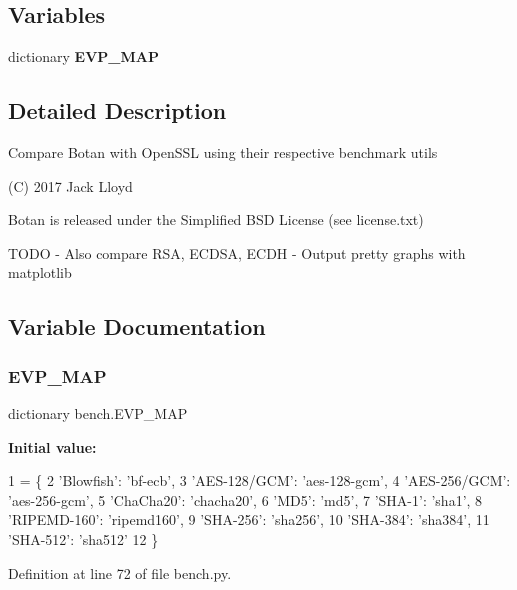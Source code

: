 \subsection*{Variables}
\begin{DoxyCompactItemize}
\item 
dictionary {\bfseries E\+V\+P\+\_\+\+M\+AP}
\end{DoxyCompactItemize}


\subsection{Detailed Description}
\begin{DoxyVerb}Compare Botan with OpenSSL using their respective benchmark utils

(C) 2017 Jack Lloyd

Botan is released under the Simplified BSD License (see license.txt)

TODO
 - Also compare RSA, ECDSA, ECDH
 - Output pretty graphs with matplotlib
\end{DoxyVerb}
 

\subsection{Variable Documentation}
\mbox{\label{namespacebench_a98d7ba7f3abbd0ee4a4530be8a201eef}} 
\subsubsection{\texorpdfstring{E\+V\+P\+\_\+\+M\+AP}{EVP\_MAP}}
{\footnotesize\ttfamily dictionary bench.\+E\+V\+P\+\_\+\+M\+AP}

{\bfseries Initial value\+:}
\begin{DoxyCode}
1 =  \{
2     \textcolor{stringliteral}{'Blowfish'}: \textcolor{stringliteral}{'bf-ecb'},
3     \textcolor{stringliteral}{'AES-128/GCM'}: \textcolor{stringliteral}{'aes-128-gcm'},
4     \textcolor{stringliteral}{'AES-256/GCM'}: \textcolor{stringliteral}{'aes-256-gcm'},
5     \textcolor{stringliteral}{'ChaCha20'}: \textcolor{stringliteral}{'chacha20'},
6     \textcolor{stringliteral}{'MD5'}: \textcolor{stringliteral}{'md5'},
7     \textcolor{stringliteral}{'SHA-1'}: \textcolor{stringliteral}{'sha1'},
8     \textcolor{stringliteral}{'RIPEMD-160'}: \textcolor{stringliteral}{'ripemd160'},
9     \textcolor{stringliteral}{'SHA-256'}: \textcolor{stringliteral}{'sha256'},
10     \textcolor{stringliteral}{'SHA-384'}: \textcolor{stringliteral}{'sha384'},
11     \textcolor{stringliteral}{'SHA-512'}: \textcolor{stringliteral}{'sha512'}
12     \}
\end{DoxyCode}


Definition at line 72 of file bench.\+py.

